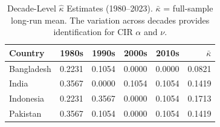 \begin{table}
\caption{Decade-Level $\hat{\kappa}$ Estimates (1980--2023). $\bar{\kappa}$ = full-sample long-run mean. The variation across decades provides identification for CIR $\alpha$ and $\nu$.}
\label{tab:decade_kappa}
\begin{tabular}{lrrrrr}
\toprule
Country & 1980s & 1990s & 2000s & 2010s & $\bar{\kappa}$ \\
\midrule
Bangladesh & 0.2231 & 0.1054 & 0.0000 & 0.0000 & 0.0821 \\
India & 0.3567 & 0.0000 & 0.1054 & 0.1054 & 0.1419 \\
Indonesia & 0.2231 & 0.3567 & 0.0000 & 0.1054 & 0.1713 \\
Pakistan & 0.3567 & 0.1054 & 0.0000 & 0.1054 & 0.1419 \\
\bottomrule
\end{tabular}
\end{table}
